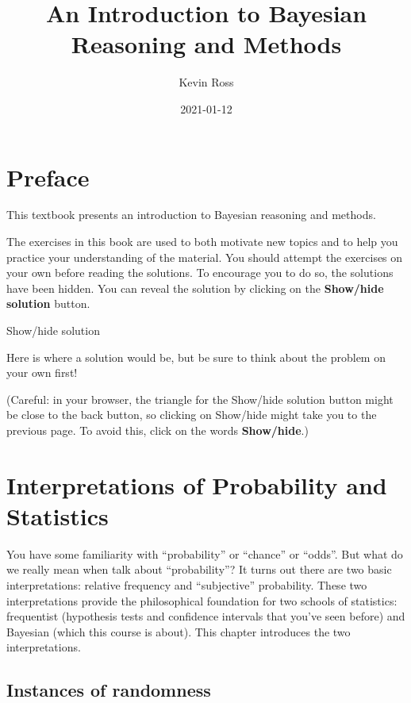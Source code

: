 \documentclass[
]{book}
\title{An Introduction to Bayesian Reasoning and Methods}
\author{Kevin Ross}
\date{2021-01-12}
\theoremstyle{definition}
\theoremstyle{definition}
\theoremstyle{definition}
\theoremstyle{remark}
\begin{document}
\maketitle

{
\setcounter{tocdepth}{1}
\tableofcontents
}
\hypertarget{preface}{%
\chapter*{Preface}\label{preface}}



This textbook presents an introduction to Bayesian reasoning and methods.

The exercises in this book are used to both motivate new topics and to help you practice your understanding of the material. You should attempt the exercises on your own before reading the solutions. To encourage you to do so, the solutions have been hidden. You can reveal the solution by clicking on the \textbf{Show/hide solution} button.

Show/hide solution

Here is where a solution would be, but be sure to think about the problem on your own first!

(Careful: in your browser, the triangle for the Show/hide solution button might be close to the back button, so clicking on Show/hide might take you to the previous page. To avoid this, click on the words \textbf{Show/hide}.)

\hypertarget{interpretations}{%
\chapter{Interpretations of Probability and Statistics}\label{interpretations}}

You have some familiarity with ``probability'' or ``chance'' or ``odds''. But what do we really mean when talk about ``probability''? It turns out there are two basic interpretations: relative frequency and ``subjective'' probability. These two interpretations provide the philosophical foundation for two schools of statistics: frequentist (hypothesis tests and confidence intervals that you've seen before) and Bayesian (which this course is about). This chapter introduces the two interpretations.

\hypertarget{randomness}{%
\section{Instances of randomness}\label{randomness}}
\end{document}

